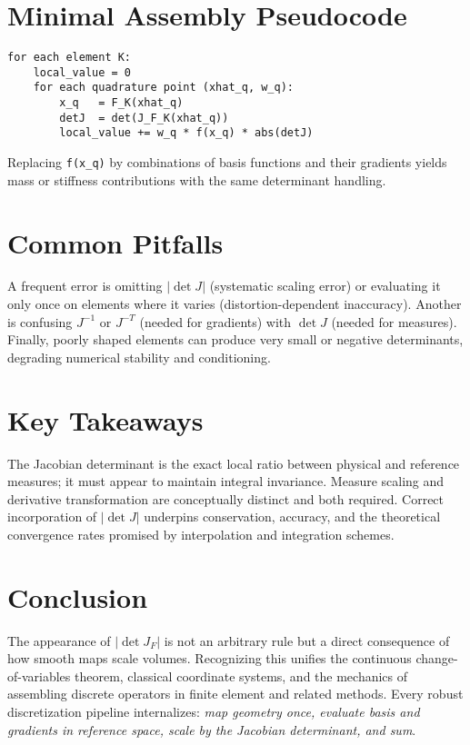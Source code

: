 \documentclass[11pt]{article}
\begin{document}
\section{Minimal Assembly Pseudocode}
\begin{verbatim}
for each element K:
    local_value = 0
    for each quadrature point (xhat_q, w_q):
        x_q   = F_K(xhat_q)
        detJ  = det(J_F_K(xhat_q))
        local_value += w_q * f(x_q) * abs(detJ)
\end{verbatim}
Replacing \verb|f(x_q)| by combinations of basis functions and their gradients yields mass or stiffness contributions with the same determinant handling.

\section{Common Pitfalls}
A frequent error is omitting $|\det J|$ (systematic scaling error) or evaluating it only once on elements where it varies (distortion-dependent inaccuracy). Another is confusing $J^{-1}$ or $J^{-T}$ (needed for gradients) with $\det J$ (needed for measures). Finally, poorly shaped elements can produce very small or negative determinants, degrading numerical stability and conditioning.

\section{Key Takeaways}
The Jacobian determinant is the exact local ratio between physical and reference measures; it must appear to maintain integral invariance. Measure scaling and derivative transformation are conceptually distinct and both required. Correct incorporation of $|\det J|$ underpins conservation, accuracy, and the theoretical convergence rates promised by interpolation and integration schemes.

\section{Conclusion}
The appearance of $|\det J_F|$ is not an arbitrary rule but a direct consequence of how smooth maps scale volumes. Recognizing this unifies the continuous change-of-variables theorem, classical coordinate systems, and the mechanics of assembling discrete operators in finite element and related methods. Every robust discretization pipeline internalizes: \emph{map geometry once, evaluate basis and gradients in reference space, scale by the Jacobian determinant, and sum}.
\end{document}
